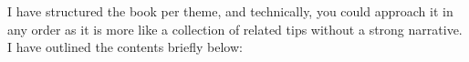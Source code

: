 


I have structured the book per theme, and technically, you could approach it in any order as it is more like a collection of related tips without a strong narrative.
I have outlined the contents briefly below:


